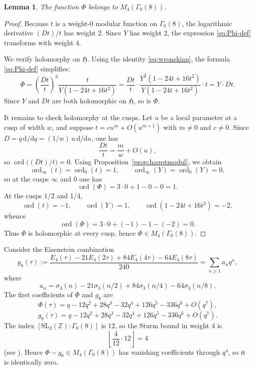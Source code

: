 \documentclass[11pt]{amsart}
\numberwithin{equation}{section}
\theoremstyle{plain}
\newtheorem{lemma}[theorem]{Lemma}
\theoremstyle{definition}
\theoremstyle{remark}
\newcommand{\Z}{\mathbb{Z}}
\newcommand{\Hh}{\mathfrak{H}}
\newcommand{\dd}{\mathrm{d}}
\newcommand{\Efour}{E_4}
\newcommand{\sigthree}{\sigma_3}
\newcommand{\Dop}{D}
\DeclareMathOperator{\ord}{ord}
\begin{document}
\begin{lemma}\label{lem:Phi-modular}
The function $\Phi$ belongs to $M_4(\Gamma_0(8))$.
\end{lemma}

\begin{proof}
Because $t$ is a weight-$0$ modular function on $\Gamma_0(8)$, the logarithmic derivative $(\Dop t)/t$ has weight $2$. Since $Y$ has weight $2$, the expression \eqref{eq:Phi-def} transforms with weight $4$.

We verify holomorphy on $\Hh$. Using the identity \eqref{eq:wronskian}, the formula \eqref{eq:Phi-def} simplifies:
\begin{equation}\label{eq:Phi-simple}
\Phi=\left(\frac{\Dop t}{t}\right)^3
\frac{t}{Y(1-24t+16t^2)}
=\frac{\Dop t}{t}\cdot\frac{Y^2(1-24t+16t^2)}{Y(1-24t+16t^2)}\cdot t
=Y\cdot\Dop t.
\end{equation}
Since $Y$ and $\Dop t$ are both holomorphic on $\Hh$, so is $\Phi$.

It remains to check holomorphy at the cusps. Let $u$ be a local parameter at a cusp of width $w$, and suppose $t=c u^m+O(u^{m+1})$ with $m\neq 0$ and $c\neq 0$. Since $\Dop=q\,\dd/\dd q=(1/w)\,u\,\dd/\dd u$, one has
\[
\frac{\Dop t}{t}=\frac{m}{w}+O(u),
\]
so $\ord\bigl((\Dop t)/t\bigr)=0$. Using Proposition~\ref{prop:hauptmodul}, we obtain
\[
\ord_{\infty}(t)=\ord_0(t)=1,
\qquad
\ord_{\infty}(Y)=\ord_0(Y)=0,
\]
so at the cusps $\infty$ and $0$ one has
\[
\ord(\Phi)=3\cdot 0+1-0-0=1.
\]
At the cusps $1/2$ and $1/4$,
\[
\ord(t)=-1,
\qquad
\ord(Y)=1,
\qquad
\ord(1-24t+16t^2)=-2,
\]
whence
\[
\ord(\Phi)=3\cdot 0+(-1)-1-(-2)=0.
\]
Thus $\Phi$ is holomorphic at every cusp, hence $\Phi\in M_4(\Gamma_0(8))$.
\end{proof}

Consider the Eisenstein combination
\begin{equation}\label{eq:g-def}
g_8(\tau):=\frac{\Efour(\tau)-21\Efour(2\tau)+84\Efour(4\tau)-64\Efour(8\tau)}{240}
=\sum_{n\ge 1}a_n q^n,
\end{equation}
where
\begin{equation}\label{eq:a-def}
a_n=\sigthree(n)-21\sigthree(n/2)+84\sigthree(n/4)-64\sigthree(n/8).
\end{equation}
The first coefficients of $\Phi$ and $g_8$ are
\begin{equation}\label{eq:Phi-q}
\Phi(\tau)=q-12q^2+28q^3-32q^4+126q^5-336q^6+O(q^7),
\end{equation}
\begin{equation}\label{eq:g-q}
g_8(\tau)=q-12q^2+28q^3-32q^4+126q^5-336q^6+O(q^7).
\end{equation}
The index $[\mathrm{SL}_2(\Z):\Gamma_0(8)]$ is $12$, so the Sturm bound in weight $4$ is
\[
\left\lfloor\frac{4}{12}\cdot 12\right\rfloor=4
\]
(see \cite[Theorem~3.13]{DiamondShurman}). Hence $\Phi-g_8\in M_4(\Gamma_0(8))$ has vanishing coefficients through $q^4$, so it is identically zero.
\end{document}
